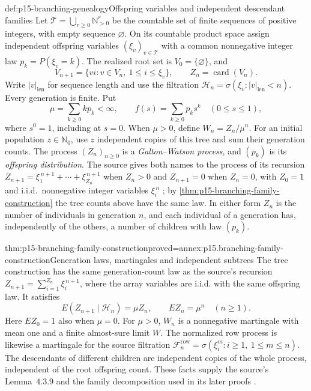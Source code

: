 \begin{hbdefinition}{def:p15-branching-genealogy}{Offspring variables and independent descendant families}
Let \(\mathcal T=\bigcup_{r\geq0}\mathbb N_{>0}^r\) be the countable
set of finite sequences of positive integers, with empty sequence
\(\varnothing\). On its countable product space assign independent
offspring variables \((\xi_v)_{v\in\mathcal T}\) with a common
nonnegative integer law \(p_k=P(\xi_v=k)\).
The realized root set is \(V_0=\{\varnothing\}\), and
\[
              V_{n+1}=\{vi:v\in V_n,\ 1\leq i\leq\xi_v\},
              \qquad Z_n=\operatorname{card}(V_n).
\]
Write \(|v|_{\mathrm{len}}\) for sequence length and use the filtration
\(\mathcal H_n=\sigma(\xi_v:|v|_{\mathrm{len}}<n)\).
Every generation is finite. Put
\[
              \mu=\sum_{k\geq0}kp_k<\infty,\qquad
              f(s)=\sum_{k\geq0}p_ks^k\quad(0\leq s\leq1),
\]
where \(s^0=1\), including at \(s=0\).
When \(\mu>0\), define \(W_n=Z_n/\mu^n\).
For an initial population \(z\in\mathbb N_0\), use \(z\) independent
copies of this tree and sum their generation counts.
The process \((Z_n)_{n\geq0}\) is a \emph{Galton--Watson process}, and
\((p_k)\) is its \emph{offspring distribution}. The source gives both
names to the process of its recursion
\(Z_{n+1}=\xi_1^{\,n+1}+\cdots+\xi_{Z_n}^{\,n+1}\) when \(Z_n>0\) and
\(Z_{n+1}=0\) when \(Z_n=0\), with \(Z_0=1\) and i.i.d.\ nonnegative
integer variables \(\xi_i^{\,n}\) \cite[p.~230, eq.~(4.3.4)]{DurrettPTEAuthor2019};
by \cref{thm:p15-branching-family-construction} the tree counts above
have the same law. In either form \(Z_n\) is the number of individuals
in generation \(n\), and each individual of a generation has,
independently of the others, a number of children with law \((p_k)\).
\end{hbdefinition}

\begin{hbtheorem}{thm:p15-branching-family-construction}{proved=annex:p15.branching-family-construction}{Generation laws, martingales and independent subtrees}
The tree construction has the same generation-count law as the source's
recursion \(Z_{n+1}=\sum_{i=1}^{Z_n}\xi_i^{\,n+1}\), where the
array variables are i.i.d. with the same offspring law. It satisfies
\[
                 E(Z_{n+1}\mid\mathcal H_n)=\mu Z_n,\qquad
                 EZ_n=\mu^n\quad(n\geq1).
\]
Here \(EZ_0=1\) also when \(\mu=0\).
For \(\mu>0\), \(W_n\) is a nonnegative martingale with mean one
and a finite almost-sure limit \(W\).
The normalized row process is likewise a martingale for the source
filtration \(\mathcal F_n^{\mathrm{row}}
=\sigma(\xi_i^m:i\geq1,\ 1\leq m\leq n)\).
The descendants of different children are independent copies of the
whole process, independent of the root offspring count.
These facts supply the source's Lemma~4.3.9 and the family decomposition
used in its later proofs \cite[pp.~230--232]{DurrettPTEAuthor2019}.
\end{hbtheorem}

